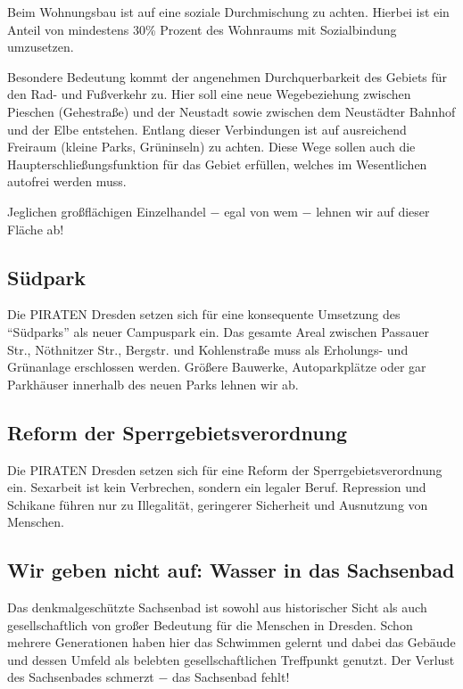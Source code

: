 \documentclass[a4paper, 11pt]{article}
\begin{document}
Beim Wohnungsbau ist auf eine soziale Durchmischung zu achten. Hierbei ist ein Anteil von mindestens 30\% Prozent des Wohnraums mit Sozialbindung umzusetzen.\newline

Besondere Bedeutung kommt der angenehmen Durchquerbarkeit des Gebiets für den Rad- und Fußverkehr zu. Hier soll eine neue Wegebeziehung zwischen Pieschen (Gehestraße) und der Neustadt sowie zwischen dem Neustädter Bahnhof und der Elbe entstehen. Entlang dieser Verbindungen ist auf ausreichend Freiraum (kleine Parks, Grüninseln) zu achten. Diese Wege sollen auch die Haupterschließungsfunktion für das Gebiet erfüllen, welches im Wesentlichen autofrei werden muss.\newline

Jeglichen großflächigen Einzelhandel $-$ egal von wem $-$ lehnen wir auf dieser Fläche ab!


\subsection{Südpark}

Die PIRATEN Dresden setzen sich für eine konsequente Umsetzung des ``Südparks'' als neuer Campuspark ein. Das gesamte Areal zwischen Passauer Str., Nöthnitzer Str., Bergstr. und Kohlenstraße muss als Erholungs- und Grünanlage erschlossen werden. Größere Bauwerke, Autoparkplätze oder gar Parkhäuser innerhalb des neuen Parks lehnen wir ab.


\subsection{Reform der Sperrgebietsverordnung}
Die PIRATEN Dresden setzen sich für eine Reform der Sperrgebietsverordnung ein. Sexarbeit ist kein Verbrechen, sondern ein legaler Beruf. Repression und Schikane führen nur zu Illegalität, geringerer Sicherheit und Ausnutzung von Menschen.


\subsection{Wir geben nicht auf: Wasser in das Sachsenbad}
Das denkmalgeschützte Sachsenbad ist sowohl aus historischer Sicht als auch gesellschaftlich von großer Bedeutung für die Menschen in Dresden. Schon mehrere Generationen haben hier das Schwimmen gelernt und dabei das Gebäude und dessen Umfeld als belebten gesellschaftlichen Treffpunkt genutzt. Der Verlust des Sachsenbades schmerzt $-$ das Sachsenbad fehlt!\newline
\end{document}

